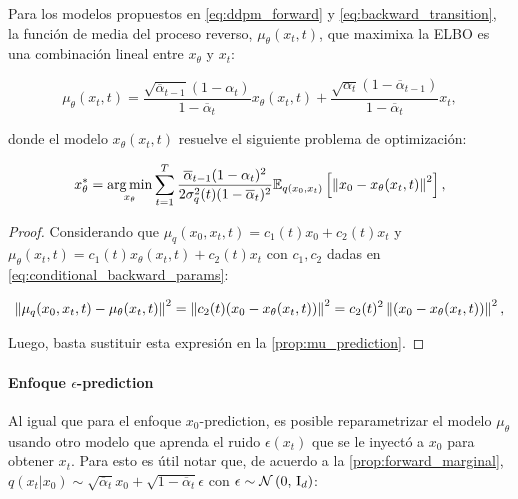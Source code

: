 \begin{prop}
    Para los modelos propuestos en \eqref{eq:ddpm_forward} y \eqref{eq:backward_transition}, la función de media del proceso reverso, $\mu_\theta(x_t,t)$, que maximixa la ELBO es una combinación lineal entre $x_\theta$ y $x_t$:

    \begin{equation*}
        \mu_\theta(x_t,t) = \frac{\sqrt{\overline{\alpha}_{t-1}}(1-\alpha_t)}{1-\overline{\alpha}_t}x_\theta(x_t,t) + \frac{\sqrt{\alpha_t}(1-\overline{\alpha}_{t-1})}{1-\overline{\alpha}_t}x_t ,
    \end{equation*}

    donde el modelo $x_\theta(x_t,t)$ resuelve el siguiente problema de optimización:

    \begin{equation*}
        x_\theta^* = \operatorname*{arg\,min}_{x_\theta} \sum_{t=1}^T \frac{\overline{\alpha}_{t-1}(1-\alpha_t)^2}{2\sigma_q^2(t)(1-\overline{\alpha}_t)^2} \mathbb{E}_{q(x_0,x_t)}\left[\left\lVert x_0-x_\theta(x_t,t) \right\rVert^2\right] ,
    \end{equation*}
\end{prop}

\begin{proof}
    Considerando que $\mu_q(x_0,x_t,t)=c_1(t)x_0 + c_2(t)x_t$ y $\mu_\theta(x_t,t)=c_1(t)x_\theta(x_t,t) + c_2(t)x_t$ con $c_1,c_2$ dadas en \eqref{eq:conditional_backward_params}:

    \begin{equation*}
        \left\lVert \mu_q(x_0,x_t,t)-\mu_\theta(x_t,t) \right\rVert^2 = \left\lVert c_2(t)(x_0-x_\theta(x_t,t)) \right\rVert^2 = c_2(t)^2 \left\lVert (x_0-x_\theta(x_t,t)) \right\rVert^2 ,
    \end{equation*}

    Luego, basta sustituir esta expresión en la \autoref{prop:mu_prediction}.
\end{proof}

\paragraph{Enfoque \texorpdfstring{$\epsilon$}{epsilon}-prediction}

Al igual que para el enfoque $x_0$-prediction, es posible reparametrizar el modelo $\mu_\theta$ usando otro modelo que aprenda el ruido $\epsilon(x_t)$ que se le inyectó a $x_0$ para obtener $x_t$. Para esto es útil notar que, de acuerdo a la \autoref{prop:forward_marginal}, $q(x_t|x_0)\sim \sqrt{\overline{\alpha}_t}x_0 + \sqrt{1-\overline{\alpha}_t}\epsilon$ con $\epsilon\sim\mathcal{N}\left(0,\,\operatorname{I}_{d}\right)$:


